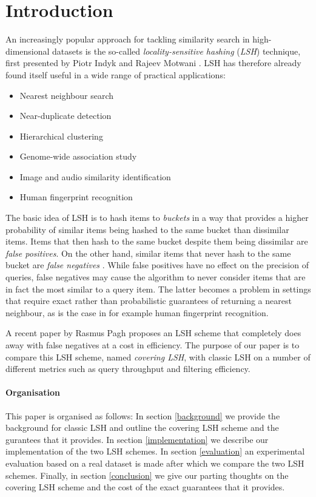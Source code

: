 \section{Introduction}
\label{introduction}

An increasingly popular approach for tackling similarity search in high-dimensional datasets is the so-called \textit{locality-sensitive hashing} (\textit{LSH}) technique, first presented by Piotr Indyk and Rajeev Motwani \cite{DBLP:conf/stoc/IndykM98}. LSH has therefore already found itself useful in a wide range of practical applications:

\begin{itemize}
  \item Nearest neighbour search
  \item Near-duplicate detection
  \item Hierarchical clustering
  \item Genome-wide association study
  \item Image and audio similarity identification
  \item Human fingerprint recognition
\end{itemize}

The basic idea of LSH is to hash items to \textit{buckets} in a way that provides a higher probability of similar items being hashed to the same bucket than dissimilar items. Items that then hash to the same bucket despite them being dissimilar are \textit{false positives}. On the other hand, similar items that never hash to the same bucket are \textit{false negatives} \cite[p. 88]{DBLP:books/cu/LeskovecRU14}. While false positives have no effect on the precision of queries, false negatives may cause the algorithm to never consider items that are in fact the most similar to a query item. The latter becomes a problem in settings that require exact rather than probabilistic guarantees of returning a nearest neighbour, as is the case in for example human fingerprint recognition.

A recent paper by Rasmus Pagh \cite{DBLP:journals/corr/Pagh15} proposes an LSH scheme that completely does away with false negatives at a cost in efficiency. The purpose of our paper is to compare this LSH scheme, named \textit{covering LSH}, with classic LSH on a number of different metrics such as query throughput and filtering efficiency.

\paragraph{Organisation} This paper is organised as follows: In section \ref{background} we provide the background for classic LSH and outline the covering LSH scheme and the gurantees that it provides. In section \ref{implementation} we describe our implementation of the two LSH schemes. In section \ref{evaluation} an experimental evaluation based on a real dataset is made after which we compare the two LSH schemes. Finally, in section \ref{conclusion} we give our parting thoughts on the covering LSH scheme and the cost of the exact guarantees that it provides.
